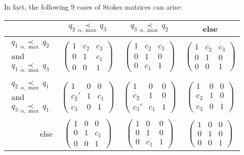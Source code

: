 In fact, the following $9$ cases of Stokes matrices can arise:
\begin{center}
  \def\arraystretch{1.3}
  \setlength\tabcolsep{4mm}
  \begin{tabular}{r|c|c|c}
    & $q_2 \underset{\alpha,\max}{\prec} q_3$
    & $q_3 \underset{\alpha,\max}{\prec} q_2$
    & else
    \tabularnewline
    \hline
    $\substack{q_1 \underset{\alpha,\max}{\prec} q_2\\\text{and}
    \\q_1 \underset{\alpha,\max}{\prec} q_3}$
    & $\begin{pmatrix} 1 & c_2 & c_3 \\0 & 1 & c_1 \\0 & 0 & 1 \end{pmatrix}$
   \cellcolor{blue!15}
    & $\begin{pmatrix} 1 & c_2 & c_3 \\0 & 1 & 0 \\0 & c_1 & 1 \end{pmatrix}$
   \cellcolor{blue!15}
    & $\begin{pmatrix} 1 & c_2 & c_3 \\0 & 1 & 0 \\0 & 0 & 1 \end{pmatrix}$
   \cellcolor{green!15}
    \tabularnewline
    \hline
    $\substack{q_2 \underset{\alpha,\max}{\prec} q_1\\\text{and}
    \\q_3 \underset{\alpha,\max}{\prec} q_1}$
    & $\begin{pmatrix} 1 & 0 & 0 \\c_2' & 1 & c_1 \\c_3 & 0 & 1 \end{pmatrix}$
   \cellcolor{blue!15}
    & $\begin{pmatrix} 1 & 0 & 0 \\c_2 & 1 & 0 \\c_3' & c_1 & 1 \end{pmatrix}$
   \cellcolor{blue!15}
    & $\begin{pmatrix} 1 & 0 & 0 \\c_2 & 1 & 0 \\c_3 & 0 & 1 \end{pmatrix}$
   \cellcolor{green!15}
    \tabularnewline
    \hline
    else
    & $\begin{pmatrix} 1 & 0 & 0 \\0 & 1 & c_1 \\0 & 0 & 1 \end{pmatrix}$
   \cellcolor{purple!15}
    & $\begin{pmatrix} 1 & 0 & 0 \\0 & 1 & 0 \\0 & c_1 & 1 \end{pmatrix}$
   \cellcolor{purple!15}
    & $\begin{pmatrix} 1 & 0 & 0 \\0 & 1 & 0 \\0 & 0 & 1 \end{pmatrix}$
  \end{tabular}
\end{center}
